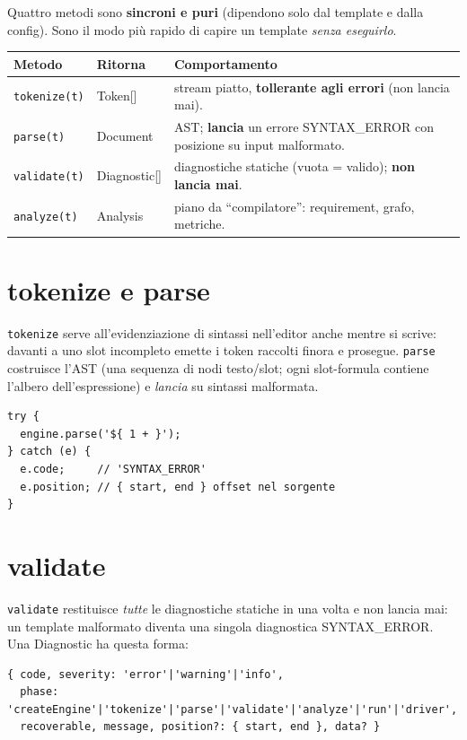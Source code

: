 \documentclass[11pt,a4paper]{book}
\let\code\lstinline
\newcommand{\ic}[1]{{\ttfamily #1}}
\theoremstyle{definition}
\begin{document}
{{{{Quattro metodi sono \textbf{sincroni e puri} (dipendono solo dal template e dalla
config). Sono il modo più rapido di capire un template \emph{senza eseguirlo}.

\begin{center}
\small
\begin{tabular}{@{}l l p{7.4cm}@{}}
\toprule
\textbf{Metodo} & \textbf{Ritorna} & \textbf{Comportamento} \\
\midrule
\code|tokenize(t)| & \ic{Token[]} & stream piatto, \textbf{tollerante agli errori}
(non lancia mai). \\
\code|parse(t)| & \ic{Document} & AST; \textbf{lancia} un errore \ic{SYNTAX\_ERROR}
con posizione su input malformato. \\
\code|validate(t)| & \ic{Diagnostic[]} & diagnostiche statiche (vuota = valido);
\textbf{non lancia mai}. \\
\code|analyze(t)| & \ic{Analysis} & piano da ``compilatore'': requirement, grafo,
metriche. \\
\bottomrule
\end{tabular}
\end{center}

\section{tokenize e parse}

\code|tokenize| serve all'evidenziazione di sintassi nell'editor anche mentre si
scrive: davanti a uno slot incompleto emette i token raccolti finora e prosegue.
\code|parse| costruisce l'AST (una sequenza di nodi testo/slot; ogni slot-formula
contiene l'albero dell'espressione) e \emph{lancia} su sintassi malformata.

\begin{lstlisting}
try {
  engine.parse('${ 1 + }');
} catch (e) {
  e.code;     // 'SYNTAX_ERROR'
  e.position; // { start, end } offset nel sorgente
}
\end{lstlisting}

\section{validate}

\code|validate| restituisce \emph{tutte} le diagnostiche statiche in una volta e
non lancia mai: un template malformato diventa una singola diagnostica
\ic{SYNTAX\_ERROR}. Una \ic{Diagnostic} ha questa forma:

\begin{lstlisting}
{ code, severity: 'error'|'warning'|'info',
  phase: 'createEngine'|'tokenize'|'parse'|'validate'|'analyze'|'run'|'driver',
  recoverable, message, position?: { start, end }, data? }
\end{lstlisting}

}}}}
\end{document}
